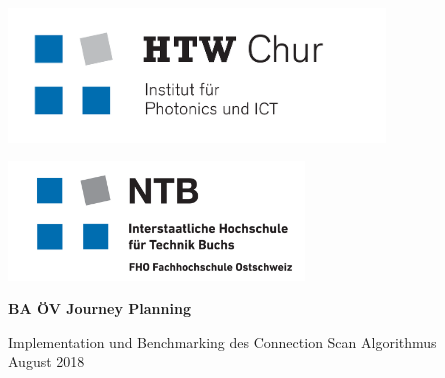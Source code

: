 \begin{titlepage}
\begin{minipage}[t]{0.5\textwidth}
	\begin{flushleft}
		\vspace{0pt}
		\includegraphics[width=0.75\textwidth]{img/htw_chur_IPI_cmyk.png}
	\end{flushleft}
\end{minipage}
\begin{minipage}[t]{0.5\textwidth}
	\begin{flushright}
		\vspace{0pt}
		\vspace{3.5mm}
		\includegraphics[width=0.59\textwidth]{img/NTB-FHO_LOGO.PNG}
	\end{flushright}
\end{minipage}

\begin{center}
\vspace{4cm}

{\LARGE \bfseries BA ÖV Journey Planning\\}

\vspace{9mm}
{\Large Implementation und Benchmarking des Connection Scan Algorithmus\\
	
\vspace{9mm}
August 2018\\[35mm]}


\end{center}
\end{titlepage}
